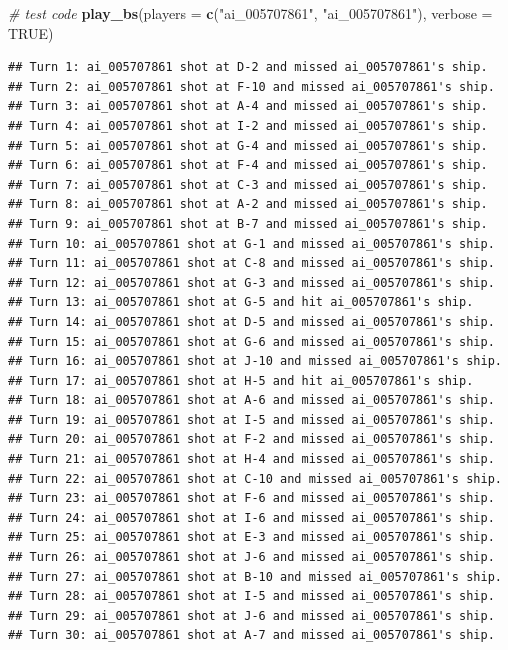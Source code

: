 \documentclass[
]{article}
\newenvironment{Shaded}{\begin{snugshade}}{\end{snugshade}}
\newcommand{\AttributeTok}[1]{\textcolor[rgb]{0.13,0.29,0.53}{#1}}
\newcommand{\CommentTok}[1]{\textcolor[rgb]{0.56,0.35,0.01}{\textit{#1}}}
\newcommand{\ConstantTok}[1]{\textcolor[rgb]{0.56,0.35,0.01}{#1}}
\newcommand{\FunctionTok}[1]{\textcolor[rgb]{0.13,0.29,0.53}{\textbf{#1}}}
\newcommand{\NormalTok}[1]{#1}
\newcommand{\StringTok}[1]{\textcolor[rgb]{0.31,0.60,0.02}{#1}}
\begin{document}
\begin{Shaded}
\begin{Highlighting}[]
\CommentTok{\# test code}
\FunctionTok{play\_bs}\NormalTok{(}\AttributeTok{players =} \FunctionTok{c}\NormalTok{(}\StringTok{"ai\_005707861"}\NormalTok{, }\StringTok{"ai\_005707861"}\NormalTok{), }\AttributeTok{verbose =} \ConstantTok{TRUE}\NormalTok{)}
\end{Highlighting}
\end{Shaded}

\begin{verbatim}
## Turn 1: ai_005707861 shot at D-2 and missed ai_005707861's ship.
## Turn 2: ai_005707861 shot at F-10 and missed ai_005707861's ship.
## Turn 3: ai_005707861 shot at A-4 and missed ai_005707861's ship.
## Turn 4: ai_005707861 shot at I-2 and missed ai_005707861's ship.
## Turn 5: ai_005707861 shot at G-4 and missed ai_005707861's ship.
## Turn 6: ai_005707861 shot at F-4 and missed ai_005707861's ship.
## Turn 7: ai_005707861 shot at C-3 and missed ai_005707861's ship.
## Turn 8: ai_005707861 shot at A-2 and missed ai_005707861's ship.
## Turn 9: ai_005707861 shot at B-7 and missed ai_005707861's ship.
## Turn 10: ai_005707861 shot at G-1 and missed ai_005707861's ship.
## Turn 11: ai_005707861 shot at C-8 and missed ai_005707861's ship.
## Turn 12: ai_005707861 shot at G-3 and missed ai_005707861's ship.
## Turn 13: ai_005707861 shot at G-5 and hit ai_005707861's ship.
## Turn 14: ai_005707861 shot at D-5 and missed ai_005707861's ship.
## Turn 15: ai_005707861 shot at G-6 and missed ai_005707861's ship.
## Turn 16: ai_005707861 shot at J-10 and missed ai_005707861's ship.
## Turn 17: ai_005707861 shot at H-5 and hit ai_005707861's ship.
## Turn 18: ai_005707861 shot at A-6 and missed ai_005707861's ship.
## Turn 19: ai_005707861 shot at I-5 and missed ai_005707861's ship.
## Turn 20: ai_005707861 shot at F-2 and missed ai_005707861's ship.
## Turn 21: ai_005707861 shot at H-4 and missed ai_005707861's ship.
## Turn 22: ai_005707861 shot at C-10 and missed ai_005707861's ship.
## Turn 23: ai_005707861 shot at F-6 and missed ai_005707861's ship.
## Turn 24: ai_005707861 shot at I-6 and missed ai_005707861's ship.
## Turn 25: ai_005707861 shot at E-3 and missed ai_005707861's ship.
## Turn 26: ai_005707861 shot at J-6 and missed ai_005707861's ship.
## Turn 27: ai_005707861 shot at B-10 and missed ai_005707861's ship.
## Turn 28: ai_005707861 shot at I-5 and missed ai_005707861's ship.
## Turn 29: ai_005707861 shot at J-6 and missed ai_005707861's ship.
## Turn 30: ai_005707861 shot at A-7 and missed ai_005707861's ship.

\end{verbatim}
\end{document}
